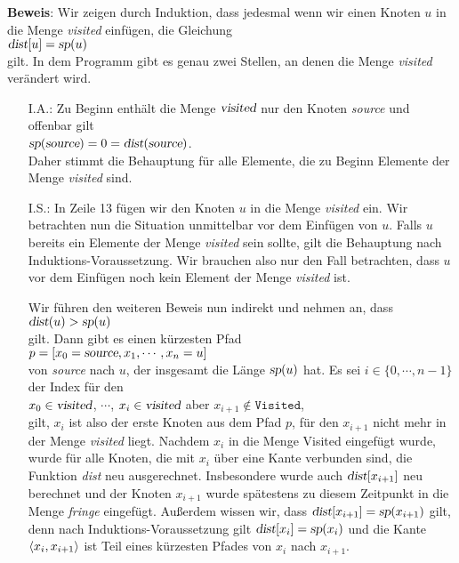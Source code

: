 \noindent
\textbf{Beweis}: Wir zeigen durch Induktion, dass jedesmal wenn wir einen Knoten $u$ in die Menge
\textsl{visited} einf\"ugen, die Gleichung
\\[0.2cm]
\hspace*{1.3cm}
$\textsl{dist}[u] = \textsl{sp}(u)$ 
\\[0.2cm]
gilt.
In dem Programm gibt es genau zwei Stellen, an denen die Menge \textsl{visited} ver\"andert wird.
\begin{enumerate}
\item[I.A.:]  
      Zu Beginn enth\"alt die Menge $\textsl{visited}$ nur den Knoten \textsl{source} und offenbar gilt
      \\[0.2cm]
      \hspace*{1.3cm}
      $\textsl{sp}(\textsl{source}) = 0 = \textsl{dist}(\textsl{source})$.
      \\[0.2cm]
      Daher stimmt die Behauptung f\"ur alle Elemente, die zu Beginn Elemente der Menge \textsl{visited} sind.
\item[I.S.:]
      In Zeile 13 f\"ugen wir den Knoten $u$ in die Menge \textsl{visited} ein.
      Wir betrachten nun die Situation unmittelbar vor dem Einf\"ugen von $u$.
      Falls  $u$ bereits ein Elemente der Menge \textsl{visited} sein sollte, gilt die Behauptung
      nach Induktions-Voraussetzung.  
      Wir brauchen also nur den Fall betrachten, dass  $u$ vor dem Einf\"ugen noch kein Element der 
      Menge \textsl{visited} ist.

      Wir f\"uhren den weiteren Beweis nun indirekt und nehmen an, dass 
      \\[0.2cm]
      \hspace*{1.3cm} $\textsl{dist}(u) > \textsl{sp}(u)$
      \\[0.2cm]
      gilt.  Dann gibt es einen k\"urzesten Pfad 
      \\[0.2cm]
      \hspace*{1.3cm} $p = [ x_0 = \textsl{source}, x_1, \cdots, x_n = u ]$
      \\[0.2cm]
      von \textsl{source} nach $u$, der insgesamt die L\"ange $\textsl{sp}(u)$ hat.
      Es sei  $i\in\{0,\cdots,n-1\}$ der Index f\"ur den 
      \\[0.2cm]
      \hspace*{1.3cm}
      $x_0\in \textsl{visited}$, $\cdots$, $x_i\in \textsl{visited}$ \quad aber \quad $x_{i+1} \not\in \mathtt{Visited}$,
      \\[0.2cm]
      gilt, $x_i$ ist also der erste Knoten aus dem Pfad $p$, f\"ur den $x_{i+1}$ nicht mehr
      in der Menge
      \textsl{visited} liegt.  Nachdem $x_i$ in die Menge Visited eingef\"ugt wurde,
      wurde f\"ur alle Knoten, die mit $x_i$ \"uber eine Kante verbunden sind,
      die Funktion \textsl{dist} neu ausgerechnet.  Insbesondere
      wurde auch $\textsl{dist}[x_{i+1}]$ neu berechnet und der Knoten $x_{i+1}$ wurde 
      sp\"atestens zu diesem Zeitpunkt in die Menge \textsl{fringe} eingef\"ugt.
      Au\ss{}erdem wissen wir, dass $\textsl{dist}[x_{i+1}] = \textsl{sp}(x_{i+1})$ gilt,
      denn nach Induktions-Voraussetzung gilt $\textsl{dist}[x_i] = \textsl{sp}(x_i)$
      und die Kante $\pair(x_i,x_{i+1})$ ist Teil eines k\"urzesten Pfades von $x_i$ nach $x_{i+1}$.
      

\end{enumerate}
